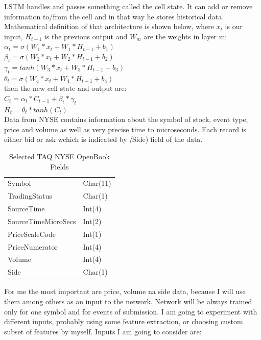 \documentclass[twoside]{article}
\begin{document}
\begin{multicols}{2}
LSTM handles and passes something called the cell state. It can add or remove information to/from the cell and in that way he stores
historical data. Mathematical definition of that architecture is shown below, where $x_{t}$ is our input, $H_{t-1}$ is the previous output and 
$W_{m}$ are the weights in layer m: \\
\newline
$ \alpha_{t} = \sigma(W_{1} * x_{t} + W_{1} * H_{t-1} + b_{1}) $ \\
$ \beta_{t} = \sigma(W_{2} * x_{t} + W_{2} * H_{t-1} + b_{2}) $ \\
$ \gamma_{t} = tanh(W_{3} * x_{t} + W_{3} * H_{t-1} + b_{3}) $ \\
$ \theta_{t} = \sigma(W_{4} * x_{t} + W_{4} * H_{t-1} + b_{4}) $ \\
\newline
then the new cell state and output are:  \\
\newline
$ C_{t} = \alpha_{t} * C_{t-1} + \beta_{t} * \gamma_{t} $ \\
$ H_{t} = \theta_{t} * tanh(C_{t}) $ \\


Data from NYSE contains information about the symbol of stock, event type, price and volume as well as very precise time to microseconds.
Each record is either bid or ask wchich is indicated by \emph(Side) field of the data.  

\begin{table}[H]
\caption{Selected TAQ NYSE OpenBook Fields}
\centering
\begin{tabular}{ll}
Symbol & Char(11) \\
TradingStatus & Char(1) \\
SourceTime & Int(4) \\
SourceTimeMicroSecs & Int(2) \\
PriceScaleCode & Int(1) \\
PriceNumerator & Int(4) \\
Volume & Int(4) \\ 
Side & Char(1) \\
\end{tabular}
\end{table}

For me the most important are price, volume na side data, because I will use them 
among others as an input to the network. Network will be always trained only for one symbol 
and for events of submission. I am going to experiment with different inputs,
probably using some feature extraction, or choosing custom subset of features by myself.
Inputs I am going to consider are:


\end{multicols}
\end{document}
